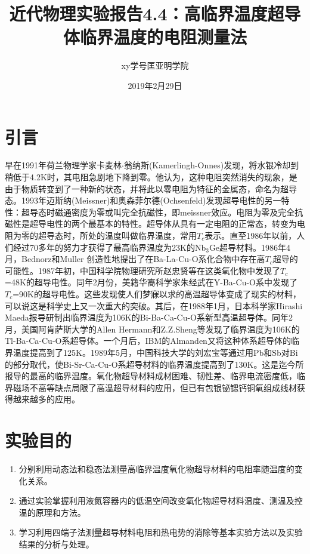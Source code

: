 \documentclass[a4paper]{article}
\title{近代物理实验报告4.4：高临界温度超导体临界温度的电阻测量法}
\author{xy\quad 学号\quad 匡亚明学院}
\date{2019年2月29日}
\begin{document}
\maketitle


\section{引言}
早在1991年荷兰物理学家卡麦林$\cdot$翁纳斯(Kamerlingh-Onnes)发现，将水银冷却到稍低于4.2K时，其电阻急剧地下降到零。他认为，这种电阻突然消失的现象，是由于物质转变到了一种新的状态，并将此以零电阻为特征的金属态，命名为超导态。1993年迈斯纳(Meissner)和奥森菲尔德(Ochsenfeld)发现超导电性的另一特性：超导态时磁通密度为零或叫完全抗磁性，即meissner效应。电阻为零及完全抗磁性是超导电性的两个最基本的特性。超导体从具有一定电阻的正常态，转变为电阻为零的超导态时，所处的温度叫做临界温度，常用$T_c$表示。直至1986年以前，人们经过70多年的努力才获得了最高临界温度为23K的Nb$_3$Ge超导材料。1986年4月，Bednorz和Muller 创造性地提出了在Ba-La-Cu-O系化合物中存在高$T_c$超导的可能性。1987年初，中国科学院物理研究所赵忠贤等在这类氧化物中发现了$T_c$=48K的超导电性。同年2月份，美籍华裔科学家朱经武在Y-Ba-Cu-O系中发现了$T_c$=90K的超导电性。这些发现使人们梦寐以求的高温超导体变成了现实的材料，可以说这是科学史上又一次重大的突破。其后，在1988年1月，日本科学家Hirashi Maeda报导研制出临界温度为106K的Bi-Ba-Ca-Cu-O系新型高温超导体。同年2月，美国阿肯萨斯大学的Allen Hermann和Z.Z.Sheng等发现了临界温度为106K的Tl-Ba-Ca-Cu-O系超导体。一个月后，IBM的Almanden又将这种体系超导体的临界温度提高到了125K。1989年5月，中国科技大学的刘宏宝等通过用Pb和Sb对Bi的部分取代，使Bi-Sr-Ca-Cu-O系超导材料的临界温度提高到了130K。这是迄今所报导的最高的临界温度。氧化物超导材料成材困难、韧性差、临界电流密度低，临界磁场不高等缺点局限了高温超导材料的应用，但已有包银铋锶钙铜氧组成线材获得越来越多的应用。

\section{实验目的}
\begin{enumerate}
\item 分别利用动态法和稳态法测量高临界温度氧化物超导材料的电阻率随温度的变化关系。
\item 通过实验掌握利用液氮容器内的低温空间改变氧化物超导材料温度、测温及控温的原理和方法。
\item 学习利用四端子法测量超导材料电阻和热电势的消除等基本实验方法以及实验结果的分析与处理。
\end{enumerate}
\end{document}
